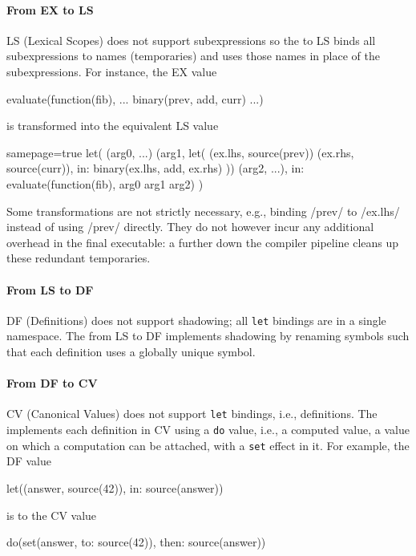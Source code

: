 \documentclass[main.tex]{subfiles}
\begin{document}
\paragraph{From EX to LS} LS (Lexical Scopes) does not support subexpressions so the  to LS binds all subexpressions to names (temporaries) and uses those names in place of the subexpressions. For instance, the EX value
\begin{il}
	evaluate(function(fib), ... binary(prev, add, curr) ...)
\end{il}
is transformed into the equivalent LS value
\begin{il*}{samepage=true}
	let(
		(arg0, ...) (arg1, let(
			(ex.lhs, source(prev)) (ex.rhs, source(curr)),
			in: binary(ex.lhs, add, ex.rhs)
		)) (arg2, ...),
		in: evaluate(function(fib), arg0 arg1 arg2)
	)
\end{il*}

Some transformations are not strictly necessary, e.g., binding \iil/prev/ to \iil/ex.lhs/ instead of using \iil/prev/ directly. They do not however incur any additional overhead in the final executable: a  further down the compiler pipeline cleans up these redundant temporaries.

\paragraph{From LS to DF} DF (Definitions) does not support shadowing; all \texttt{let} bindings are in a single namespace. The  from LS to DF implements shadowing by renaming symbols such that each definition uses a globally unique symbol.

\paragraph{From DF to CV} CV (Canonical Values) does not support \texttt{let} bindings, i.e., definitions. The  implements each definition in CV using a \texttt{do} value, i.e., a computed value, a value on which a computation can be attached, with a \texttt{set} effect in it. For example, the DF value
\begin{il}
	let((answer, source(42)), in: source(answer))
\end{il}
is \lowered{} to the CV value
\begin{il}
	do(set(answer, to: source(42)), then: source(answer))
\end{il}
\end{document}
